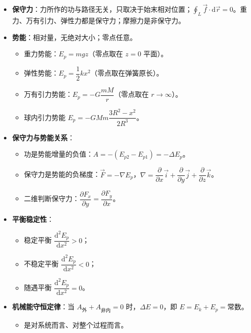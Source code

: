 \documentclass[12pt,a4paper]{ctexart}
\begin{document}
\begin{itemize}
    \item \textbf{保守力}：力所作的功与路径无关，只取决于始末相对位置；$\displaystyle\oint_L \vec{f}\cdot\mathrm{d}\vec{r} = 0$。重力、万有引力、弹性力都是保守力；摩擦力是非保守力。
    \item \textbf{势能}：相对量，无绝对大小；零点任意。
    \begin{itemize}
        \item 重力势能：$E_p = mgz$（零点取在 $z=0$ 平面）。
        \item 弹性势能：$E_p = \dfrac{1}{2}kx^2$（零点取在弹簧原长）。
        \item 万有引力势能：$E_p = -G\dfrac{mM}{r}$（零点取在 $r\to\infty$）。
        \item 球内引力势能 $E_p = -GMm\dfrac{3R^2 - x^2}{2R^3}$。
    \end{itemize}
    \item \textbf{保守力与势能关系}：
    \begin{itemize}
        \item 功是势能增量的负值：$A = -(E_{p2} - E_{p1}) = -\Delta E_p$。
        \item 保守力是势能的负梯度：$\vec{F} = -\nabla E_p$，$\nabla = \dfrac{\partial}{\partial x}\vec{i} + \dfrac{\partial}{\partial y}\vec{j} + \dfrac{\partial}{\partial z}\vec{k}$。
        \item 二维判断保守力：$\dfrac{\partial F_x}{\partial y} = \dfrac{\partial F_y}{\partial x}$。
    \end{itemize}
    \item \textbf{平衡稳定性}：
    \begin{itemize}
        \item 稳定平衡 $\dfrac{\mathrm{d}^2 E_p}{\mathrm{d}x^2} > 0$；
        \item 不稳定平衡 $\dfrac{\mathrm{d}^2 E_p}{\mathrm{d}x^2} < 0$；
        \item 随遇平衡 $\dfrac{\mathrm{d}^2 E_p}{\mathrm{d}x^2} = 0$。
    \end{itemize}
    \item \textbf{机械能守恒定律}：当 $A_{\text{外}} + A_{\text{非内}} = 0$ 时，$\Delta E = 0$，即 $E = E_k + E_p = \text{常数}$。
    \begin{itemize}
        \item 是对系统而言、对整个过程而言。
    \end{itemize}
\end{itemize}
\end{document}
